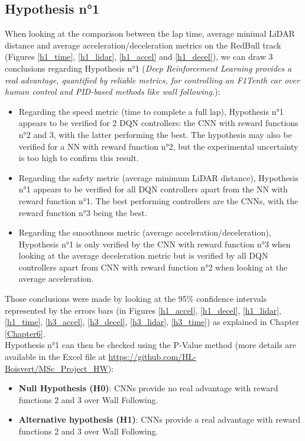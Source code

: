 \subsection{Hypothesis n°1}
\label{reflexions_h1}
When looking at the comparison between the lap time, average minimal LiDAR distance and average acceleration/deceleration metrics on the RedBull track (Figures \ref{h1_time}, \ref{h1_lidar}, \ref{h1_accel} and \ref{h1_decel}), we can draw 3 conclusions regarding Hypothesis n°1 (\textit{Deep Reinforcement Learning provides a real advantage, quantified by reliable metrics, for controlling an F1Tenth car over human control and PID-based methods like wall following.}):
\begin{itemize}
	\item  Regarding the speed metric (time to complete a full lap), Hypothesis n°1 appears to be verified for 2 DQN controllers: the CNN with reward functions n°2 and 3, with the latter performing the best. The hypothesis may also be verified for a NN with reward function n°2, but the experimental uncertainty is too high to confirm this result.
	\item Regarding the safety metric (average minimum LiDAR distance), Hypothesis n°1 appears to be verified for all DQN controllers apart from the NN with reward function n°1. The best performing controllers are the CNNs, with the reward function n°3 being the best.
	\item Regarding the smoothness metric (average acceleration/deceleration), Hypothesis n°1 is only verified by the CNN with reward function n°3 when looking at the average deceleration metric but is verified by all DQN controllers apart from CNN with reward function n°2 when looking at the average acceleration. 
\end{itemize}

Those conclusions were made by looking at the 95\% confidence intervals represented by the errors bars (in Figures \ref{h1_accel}, \ref{h1_decel}, \ref{h1_lidar}, \ref{h1_time}, \ref{h3_accel}, \ref{h3_decel}, \ref{h3_lidar}, \ref{h3_time}) as explained in  Chapter \ref{Chapter6}. \\
Hypothesis n°1 can then be checked using the P-Value method (more details are available in the Excel file at \url{https://github.com/HL-Boisvert/MSc_Project_HW}): \\

\begin{itemize}
	\item \textbf{Null Hypothesis (H0)}: CNNs provide no real advantage with reward functions 2 and 3 over Wall Following. 
	\item \textbf{Alternative hypothesis (H1)}: CNNs provide a real advantage with reward functions 2 and 3 over Wall Following.
\end{itemize}

